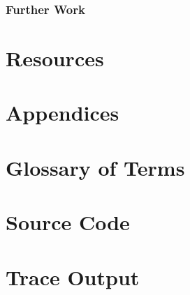 \subsection{Further Work}


\chapter{Resources}
\nocite{*}



\chapter{Appendices}
\appendix

\chapter{Glossary of Terms}\label{sec:glosterm}
\printglossaries

\newpage
\chapter{Source Code}\label{sec:srccode}

\newpage
\chapter{Trace Output}\label{sec:traceout}



